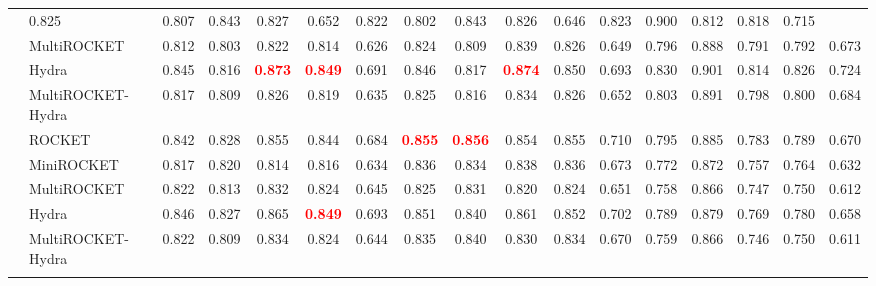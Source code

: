 \begin{table}[tbp]
{\begin{tabular}{llccccc|ccccc|ccccc}
              & 0.825 & 0.807 & 0.843 & 0.827 & 0.652  
              & 0.822 & 0.802 & 0.843 & 0.826 & 0.646 
              & 0.823 & 0.900 & 0.812 & 0.818 & 0.715 \\
              & MultiROCKET 
              & 0.812 & 0.803 & 0.822 & 0.814 & 0.626  
              & 0.824 & 0.809 & 0.839 & 0.826 & 0.649  
              & 0.796 & 0.888 & 0.791 & 0.792 & 0.673 \\
              & Hydra 
              & 0.845 & 0.816 & \textcolor{red}{\textbf{0.873}} & \textcolor{red}{\textbf{0.849}} & 0.691  
              & 0.846 & 0.817 & \textcolor{red}{\textbf{0.874}} & 0.850 & 0.693  
              & 0.830 & 0.901 & 0.814 & 0.826 & 0.724 \\
              & MultiROCKET-Hydra 
              & 0.817 & 0.809 & 0.826 & 0.819 & 0.635  
              & 0.825 & 0.816 & 0.834 & 0.826 & 0.652  
              & 0.803 & 0.891 & 0.798 & 0.800 & 0.684 \\
\midrule
{} 
              & ROCKET  
              & 0.842 & 0.828 & 0.855 & 0.844 & 0.684  
              & \textcolor{red}{\textbf{0.855}} & \textcolor{red}{\textbf{0.856}} & 0.854 & 0.855 & 0.710  
              & 0.795 & 0.885 & 0.783 & 0.789 & 0.670 \\
              & MiniROCKET 
              & 0.817 & 0.820 & 0.814 & 0.816 & 0.634  
              & 0.836 & 0.834 & 0.838 & 0.836 & 0.673  
              & 0.772 & 0.872 & 0.757 & 0.764 & 0.632 \\
              & MultiROCKET 
              & 0.822 & 0.813 & 0.832 & 0.824 & 0.645  
              & 0.825 & 0.831 & 0.820 & 0.824 & 0.651  
              & 0.758 & 0.866 & 0.747 & 0.750 & 0.612 \\
              & Hydra 
              & 0.846 & 0.827 & 0.865 & \textcolor{red}{\textbf{0.849}} & 0.693  
              & 0.851 & 0.840 & 0.861 & 0.852 & 0.702  
              & 0.789 & 0.879 & 0.769 & 0.780 & 0.658 \\
              & MultiROCKET-Hydra 
              & 0.822 & 0.809 & 0.834 & 0.824 & 0.644  
              & 0.835 & 0.840 & 0.830 & 0.834 & 0.670  
              & 0.759 & 0.866 & 0.746 & 0.750 & 0.611 \\
\midrule
{} 

\end{tabular}}
\end{table}
